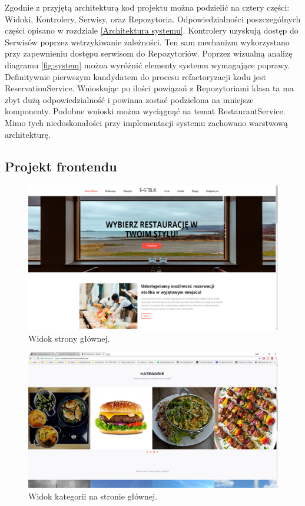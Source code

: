 \documentclass{article}
\begin{document}
Zgodnie z przyjętą architekturą kod projektu można podzielić na cztery części: Widoki, Kontrolery, Serwisy, oraz Repozytoria. Odpowiedzialności poszczególnych części opisano w rozdziale \ref{Architektura systemu}. Kontrolery uzyskują dostęp do Serwisów poprzez wstrzykiwanie zależności. Ten sam mechanizm wykorzystano przy zapewnieniu dostępu serwisom do Repozytoriów. Poprzez wizualną analizę diagramu \ref{fig:system} można wyróżnić elementy systemu wymagające poprawy. Definitywnie pierwszym kandydatem do procesu refactoryzacji kodu jest ReservationService. Wnioskując po ilości powiązań z Repozytoriami klasa ta ma zbyt dużą odpowiedzialność i powinna zostać podzielona na mniejsze komponenty. Podobne wnioski można wyciągnąć na temat RestaurantService. Mimo tych niedoskonałości przy implementacji systemu zachowano warstwową architekturę.

\subsection{Projekt frontendu}

\begin{figure}[H]
\centering
	\includegraphics[width=1.00\textwidth]{screens/index1.png}
	\caption[caption]{Widok strony głównej.}
	\label{fig:index}
\end{figure}

\begin{figure}[H]
\centering
	\includegraphics[width=1.00\textwidth]{screens/index2.png}
	\caption[caption]{Widok kategorii na stronie głównej.}
	\label{fig:index_category}
\end{figure}
\end{document}
